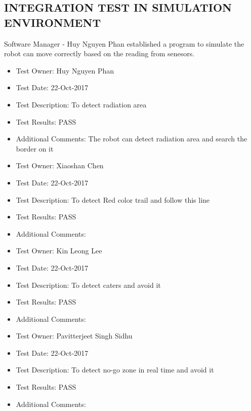 \documentclass[10pt,a4paper,titlepage]{article}
\begin{document}
\subsection{INTEGRATION TEST IN SIMULATION ENVIRONMENT}
Software Manager - Huy Nguyen Phan established a program to simulate the robot can move correctly based on the reading from senesors.


\begin{itemize}
\item Test Owner:  Huy Nguyen Phan
\item Test Date: 22-Oct-2017
\item Test Description: To detect radiation area 
\item Test Results: PASS
\item Additional Comments: The robot can detect radiation area and search the border on it
	
\end{itemize}


\begin{itemize}
\item Test Owner:  Xiaoshan Chen
\item Test Date: 22-Oct-2017
\item Test Description: To detect Red color trail and follow this line
\item Test Results: PASS
\item Additional Comments:	
\end{itemize}


\begin{itemize}
\item Test Owner:  Kin Leong Lee
\item Test Date: 22-Oct-2017
\item Test Description: To detect caters and avoid it
\item Test Results: PASS
\item Additional Comments:

\end{itemize}

\begin{itemize}
\item Test Owner:  Pavitterjeet Singh Sidhu
\item Test Date: 22-Oct-2017
\item Test Description: To detect no-go zone in real time and avoid it
\item Test Results: PASS
\item Additional Comments:	
\end{itemize}
\end{document}
